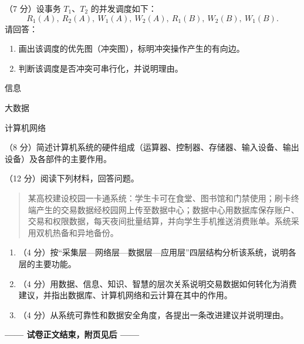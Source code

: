\documentclass[a4paper,11pt]{article}
\begin{document}
\q （7 分）设事务 $T_1$、$T_2$ 的并发调度如下：
\[
R_1(A),\ R_2(A),\ W_1(A),\ W_2(A),\ R_1(B),\ W_2(B),\ W_1(B).
\]
请回答：
\begin{enumerate}[label=（\arabic*）, leftmargin=2.4em, itemsep=1pt]
  \item 画出该调度的优先图（冲突图），标明冲突操作产生的有向边。
  \item 判断该调度是否冲突可串行化，并说明理由。
\end{enumerate}
\anslines{7cm}



\q 信息
\anslines{3cm}

\q 大数据
\anslines{3cm}

\q 计算机网络
\anslines{3cm}


\q （8 分）简述计算机系统的硬件组成（运算器、控制器、存储器、输入设备、输出设备）及各部件的主要作用。
\anslines{5.5cm}


\q （12 分）阅读下列材料，回答问题。
\begin{quote}\small
某高校建设校园一卡通系统：学生卡可在食堂、图书馆和门禁使用；刷卡终端产生的交易数据经校园网上传至数据中心；数据中心用数据库保存账户、交易和权限数据，每天夜间批量结算，并向学生手机推送消费账单。系统采用双机热备和异地备份。
\end{quote}
\begin{enumerate}[label=（\arabic*）, leftmargin=2.4em, itemsep=1pt]
  \item （4 分）按“采集层—网络层—数据层—应用层”四层结构分析该系统，说明各层的主要功能。
  \item （4 分）用数据、信息、知识、智慧的层次关系说明交易数据如何转化为消费建议，并指出数据库、计算机网络和云计算在其中的作用。
  \item （4 分）从系统可靠性和数据安全角度，各提出一条改进建议并说明理由。
\end{enumerate}
\anslines{12cm}

\vfill
\begin{center}
\textbf{—— 试卷正文结束，附页见后 ——}
\end{center}

\end{document}
